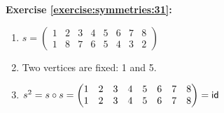 \noindent\textbf{Exercise \ref{exercise:symmetries:31}:}
\begin{enumerate}[{a.}]
\item
$s =\begin{pmatrix}
	1 & 2 & 3 & 4 & 5 & 6 & 7 & 8\\
	1 & 8 & 7 & 6 & 5 & 4 & 3 & 2
	\end{pmatrix}$
	
\item
Two vertices are fixed: 1 and 5.

\item
$s^2 = s\circ s = \begin{pmatrix}
	1 & 2 & 3 & 4 & 5 & 6 & 7 & 8\\
	1 & 2 & 3 & 4 & 5 & 6 & 7 & 8
	\end{pmatrix} = \sf{id}$
\end{enumerate}

